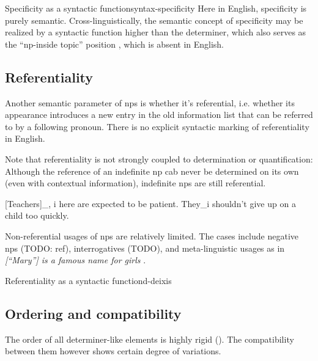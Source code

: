 \documentclass[UTF8, a4paper, oneside, scheme=plain]{ctexrep}
\newcommand*{\citepage}[1]{p.~{#1}}
\newcommand{\corpus}[1]{\emph{#1}}
\begin{document}
\begin{infobox}{Specificity as a syntactic function}{syntax-specificity}
    Here in English, 
    specificity is purely semantic.
    Cross-linguistically, the semantic concept of specificity 
    may be realized by a syntactic function
    higher than the determiner,
    which also serves as the ``\acs{np}-inside topic'' position 
    \citep{ihsane2001specific},
    which is absent in English.
\end{infobox}


\subsection{Referentiality}\label{sec:np.det.deixis}

Another semantic parameter of \acs{np}s is whether it's referential,
i.e. whether its appearance introduces a new entry in the old information list 
that can be referred to by a following pronoun.
There is no explicit syntactic marking of referentiality in English.

Note that referentiality is not strongly coupled to determination or quantification:
Although the reference of an indefinite \acs{np} cab never be determined on its own 
(even with contextual information),
indefinite \acs{np}s are still referential.

\begin{exe}
    \ex {} [Teachers]_{, i} here are expected to be patient. 
    They_i shouldn't give up on a child too quickly.
\end{exe}

Non-referential usages of \acs{np}s are relatively limited.
The cases include negative \acs{np}s (TODO: ref), 
interrogatives (TODO), 
and meta-linguistic usages as in \corpus{[``Mary''] is a famous name for girls}
\citep[\citepage{400}]{cgel}.

\begin{infobox}{Referentiality as a syntactic function}{d-deixis}
    
\end{infobox}

\subsection{Ordering and compatibility}

The order of all determiner-like elements is highly rigid ().
The compatibility between them however shows certain degree of variations.
\end{document}
